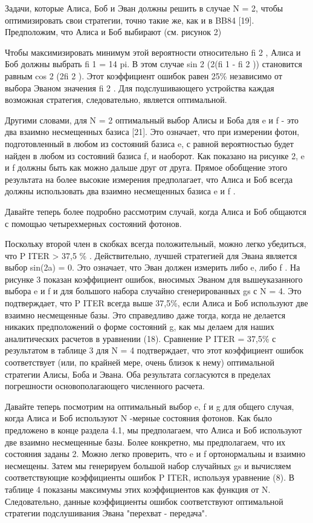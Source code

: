 Задачи, которые Алиса, Боб и Эван должны решить в случае N = 2, чтобы оптимизировать свои стратегии, точно такие же, как и в BB84 [19]. Предположим, что Алиса и Боб выбирают (см. рисунок 2)

Чтобы максимизировать минимум этой вероятности относительно fi 2 , Алиса и Боб должны выбрать fi 1 = 14 pi. В этом случае sin 2 (2(fi 1 - fi 2 )) становится равным cos 2 (2fi 2 ). Этот коэффициент ошибок равен 25\% независимо от выбора Эваном значения fi 2 . Для подслушивающего устройства каждая возможная стратегия, следовательно, является оптимальной.

Другими словами, для N = 2 оптимальный выбор Алисы и Боба для e и f - это два взаимно несмещенных базиса [21]. Это означает, что при измерении фотон, подготовленный в любом из состояний базиса e, с равной вероятностью будет найден в любом из состояний базиса f, и наоборот. Как показано на рисунке 2, e и f должны быть как можно дальше друг от друга. Прямое обобщение этого результата на более высокие измерения предполагает, что Алиса и Боб всегда должны использовать два взаимно несмещенных базиса e и f .

Давайте теперь более подробно рассмотрим случай, когда Алиса и Боб общаются с помощью четырехмерных состояний фотонов. 

Поскольку второй член в скобках всегда положительный, можно легко убедиться, что P ITER > 37,5 \% .
Действительно, лучшей стратегией для Эвана является выбор sin(2a) = 0. Это означает, что Эван должен измерить либо e, либо f .
На рисунке 3 показан коэффициент ошибок, вносимых Эваном для вышеуказанного выбора e и f и для большого набора случайно сгенерированных gs с N = 4. Это подтверждает, что P ITER всегда выше 37,5\%, если Алиса и Боб используют две взаимно несмещенные базы. Это справедливо даже тогда, когда не делается никаких предположений о форме состояний g, как мы делаем для наших аналитических расчетов в уравнении (18). Сравнение P ITER = 37,5\% с результатом в таблице 3 для N = 4 подтверждает, что этот коэффициент ошибок соответствует (или, по крайней мере, очень близок к нему) оптимальной стратегии Алисы, Боба и Эвана. Оба результата согласуются в пределах погрешности основополагающего численного расчета.

Давайте теперь посмотрим на оптимальный выбор e, f и g для общего случая, когда Алиса и Боб используют N -мерные состояния фотонов. Как было предложено в конце раздела 4.1, мы предполагаем, что Алиса и Боб используют две взаимно несмещенные базы. Более конкретно, мы предполагаем, что их состояния заданы 2. Можно легко проверить, что e и f ортонормальны и взаимно несмещены. Затем мы генерируем большой набор случайных gs и вычисляем соответствующие коэффициенты ошибок P ITER, используя уравнение (8). В таблице 4 показаны максимумы этих коэффициентов как функция от N. Следовательно, данные коэффициенты ошибок соответствуют оптимальной стратегии подслушивания Эвана "перехват - передача".


